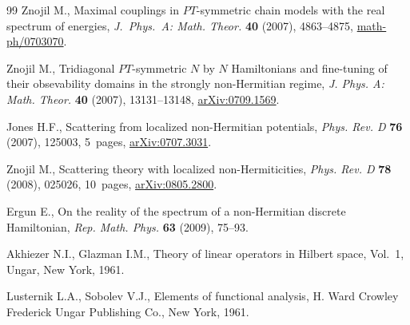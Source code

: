 \documentclass[pdftex]{sigma}
\numberwithin{equation}{section}
\begin{document}
\begin{thebibliography}{99}
\bibitem{[11]} Znojil M., Maximal couplings in $PT$-symmetric chain models
with the real spectrum of energies, \textit{J.~Phys.~A: Math. Theor.}
\textbf{40} (2007), 4863--4875, \href{http://arxiv.org/abs/math-ph/0703070}{math-ph/0703070}.

\bibitem{[12]} Znojil M., Tridiagonal $PT$-symmetric $N$ by $N$ Hamiltonians
and f\/ine-tuning of their obsevability domains in the strongly non-Hermitian
regime, \textit{J. Phys. A: Math. Theor.} \textbf{40} (2007), 13131--13148, \href{http://arxiv.org/abs/0709.1569}{arXiv:0709.1569}.

\bibitem{[13]} Jones H.F., Scattering from localized non-Hermitian potentials, \textit{Phys. Rev. D} \textbf{76} (2007), 125003, 5~pages, \href{http://arxiv.org/abs/0707.3031}{arXiv:0707.3031}.

\bibitem{[14]} Znojil M., Scattering theory with localized
non-Hermiticities, \textit{Phys. Rev. D} \textbf{78} (2008), 025026, 10~pages, \href{http://arxiv.org/abs/0805.2800}{arXiv:0805.2800}.

\bibitem{[15]} Ergun E., On the reality of the spectrum of a non-Hermitian
discrete Hamiltonian, \textit{Rep. Math. Phys.} \textbf{63} (2009), 75--93.

\bibitem{[16]} Akhiezer N.I., Glazman I.M., Theory of linear operators in
Hilbert space, Vol.~1, Ungar, New York, 1961.

\bibitem{[17]} Lusternik L.A., Sobolev V.J., Elements of functional
analysis, H. Ward Crowley Frederick Ungar Publishing Co., New York, 1961.

\end{thebibliography}\LastPageEnding
\end{document}
